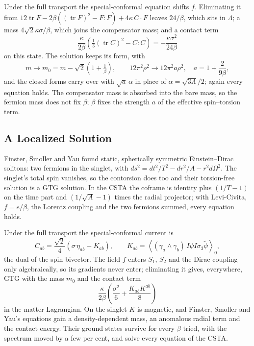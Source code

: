 \documentclass[11pt,a4paper]{article}
\newcommand{\rev}[1]{\widetilde{#1}}
\newcommand{\grade}[2]{\left\langle #1\right\rangle_{#2}}
\begin{document}
Under the full transport the special-conformal equation shifts \(f\).
Eliminating it from \(12\operatorname{tr}F-2\beta((\operatorname{tr}F)^2
-F{:}F)+4\kappa\,C\cdot F\) leaves \(24/\beta\), which sits in
\(\Lambda\); a mass \(4\sqrt2\kappa\sigma/\beta\), which joins the
compensator mass; and a contact term
\[
    \frac{\kappa}{2\beta}\left(\tfrac13(\operatorname{tr}C)^2-C{:}C\right)
    =-\frac{\kappa\sigma^2}{24\beta}
\]
on this state. The solution keeps its form, with
\[
    m\to m_0=m-\sqrt2\left(1+\tfrac1\beta\right),\qquad
    12\pi^2\rho^2\to12\pi^2a\rho^2,\quad a=1+\frac2{9\beta},
\]
and the closed forms carry over with \(\sqrt a\,\alpha\) in place of
\(\alpha=\sqrt{3\Lambda}/2\); again every equation holds. The
compensator mass is absorbed into the bare mass, so the fermion mass
does not fix \(\beta\); \(\beta\) fixes the strength \(a\) of the
effective spin--torsion term.

\subsection{A Localized Solution}

Finster, Smoller and Yau \cite{FSY} found static, spherically symmetric
Einstein--Dirac solitons: two fermions in the singlet, with
\(ds^2=dt^2/T^2-dr^2/A-r^2d\Omega^2\). The singlet's total spin
vanishes, so the contorsion does too and their torsion-free solution is
a GTG solution. In the CSTA the coframe is identity plus \((1/T-1)\) on
the time part and \((1/\sqrt A-1)\) times the radial projector; with
Levi-Civita, \(f=e/\beta\), the Lorentz coupling and the two fermions
summed, every equation holds.

Under the full transport the special-conformal current is
\[
    C_{ab}=\frac{\sqrt2}4\left(\sigma\,\eta_{ab}+K_{ab}\right),\qquad
    K_{ab}=\grade{(\gamma_a\wedge\gamma_b)\,I\psi I\sigma_3\rev\psi}{0},
\]
the dual of the spin bivector. The field \(f\) enters \(S_1\), \(S_2\)
and the Dirac coupling only algebraically, so its gradients never
enter; eliminating it gives, everywhere, GTG with the mass \(m_0\) and
the contact term
\[
    \frac\kappa{2\beta}\left(\frac{\sigma^2}6+\frac{K_{ab}K^{ab}}8\right)
\]
in the matter Lagrangian. On the singlet \(K\) is magnetic, and
Finster, Smoller and Yau's equations gain a density-dependent mass, an
anomalous radial term and the contact energy. Their ground states
survive for every \(\beta\) tried, with the spectrum moved by a few per
cent, and solve every equation of the CSTA.

\end{document}
